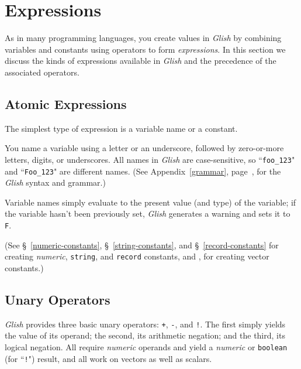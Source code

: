 
\chapter{Expressions}
\label{expressions}

As in many programming languages, you create values in {\em Glish} by
combining variables and constants using operators to form {\em expressions}.
In this section we discuss the kinds of expressions available in {\em Glish}
and the precedence of the associated operators.

\section{Atomic Expressions}

The simplest type of expression is a variable name or a constant.

You name a variable \label{variables}
using a letter or an underscore, followed by
zero-or-more letters, digits, or underscores.  All names in {\em Glish}
are case-sensitive, so ``{\tt foo\_123}" and ``{\tt Foo\_123}"
are different names.  (See Appendix~\ref{grammar}, page~\pageref{grammar},
for the {\em Glish} syntax and grammar.)

Variable names simply evaluate to the present value (and type)
of the variable; if the variable hasn't been previously set, {\em Glish}
generates a warning and sets it to {\tt F}.

(See \S~\ref{numeric-constants}, \S~\ref{string-constants},
and \S~\ref{record-constants} for creating {\em numeric}, {\tt string}, and
{\tt record} constants, and ,
for creating vector constants.)

\section{Unary Operators}

{\em Glish} provides three basic unary operators:
{\tt +},
{\tt -},
and {\tt !}.
The first simply yields the value of its operand; the second, its
arithmetic negation; and the third, its logical negation.  All require
{\em numeric} operands and yield a {\em numeric} or {\tt boolean}
(for ``{\tt !}")
result, and all work on vectors as well as scalars.

